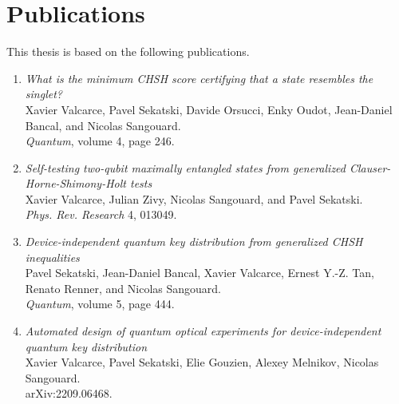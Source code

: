 \chapter{Publications}

This thesis is based on the following publications.

\begin{enumerate}
	\item 
		\textit{What is the minimum CHSH score certifying that a state resembles the singlet?} \\
		Xavier Valcarce, Pavel Sekatski, Davide Orsucci, Enky Oudot, Jean-Daniel Bancal, and Nicolas Sangouard. \\
		\textit{Quantum}, volume 4, page 246.
	\item 
		\textit{Self-testing two-qubit maximally entangled states from generalized Clauser-Horne-Shimony-Holt tests} \\
		Xavier Valcarce, Julian Zivy, Nicolas Sangouard, and Pavel Sekatski. \\
		\textit{Phys. Rev. Research} 4, 013049.
	\item
		\textit{Device-independent quantum key distribution from generalized CHSH inequalities} \\
		Pavel Sekatski, Jean-Daniel Bancal, Xavier Valcarce, Ernest Y.-Z. Tan, Renato Renner, and Nicolas Sangouard. \\
		\textit{Quantum}, volume 5, page 444.
	\item
		\textit{Automated design of quantum optical experiments for device-independent quantum key distribution}  \\
		Xavier Valcarce, Pavel Sekatski, Elie Gouzien, Alexey Melnikov, Nicolas Sangouard. \\
		arXiv:2209.06468.
\end{enumerate}
